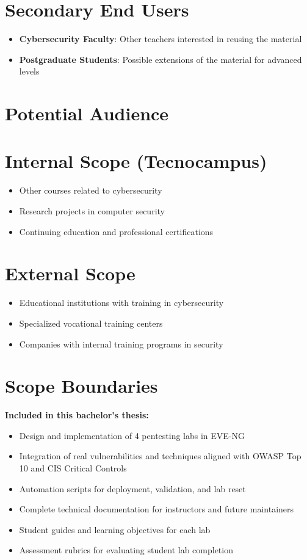 \section{Secondary End Users}

\begin{itemize}
\item \textbf{Cybersecurity Faculty}: Other teachers interested in reusing the material
\item \textbf{Postgraduate Students}: Possible extensions of the material for advanced levels
\end{itemize}

\section{Potential Audience}

\section{Internal Scope (Tecnocampus)}

\begin{itemize}
\item Other courses related to cybersecurity
\item Research projects in computer security
\item Continuing education and professional certifications
\end{itemize}

\section{External Scope}

\begin{itemize}
\item Educational institutions with training in cybersecurity
\item Specialized vocational training centers
\item Companies with internal training programs in security
\end{itemize}

\section{Scope Boundaries}

\textbf{Included in this bachelor's thesis:}

\begin{itemize}
    \item Design and implementation of 4 pentesting labs in EVE-NG
    \item Integration of real vulnerabilities and techniques aligned with 
          OWASP Top 10 and CIS Critical Controls\cite{cis_controls}
    \item Automation scripts for deployment, validation, and lab reset
    \item Complete technical documentation for instructors and future maintainers
    \item Student guides and learning objectives for each lab
    \item Assessment rubrics for evaluating student lab completion
\end{itemize}

